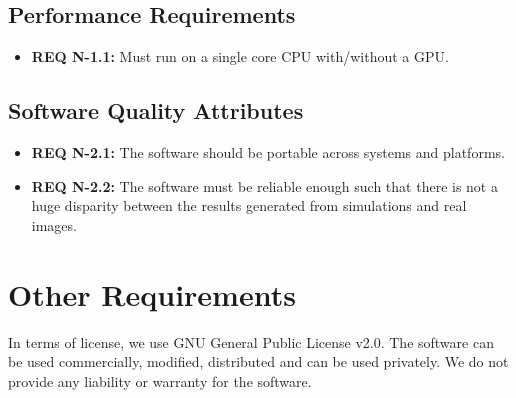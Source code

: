 \documentclass[a4paper,12pt]{article}
\begin{document}
\subsection{Performance Requirements}
\begin{itemize}
\item \textbf{REQ N-1.1:} Must run on a single core CPU with/without a GPU.
\end{itemize}

\subsection{Software Quality Attributes}
\begin{itemize}
\item \textbf{REQ N-2.1:} The software should be portable across systems and platforms.
\item \textbf{REQ N-2.2:} The software must be reliable enough such that there is not a huge disparity between the results generated from simulations and real images.
\end{itemize}

\section{Other Requirements}
In terms of license, we use GNU General Public License v2.0. The software can be used commercially, modified, distributed and can be used privately. We do not provide any liability or warranty for the software.
\end{document}
